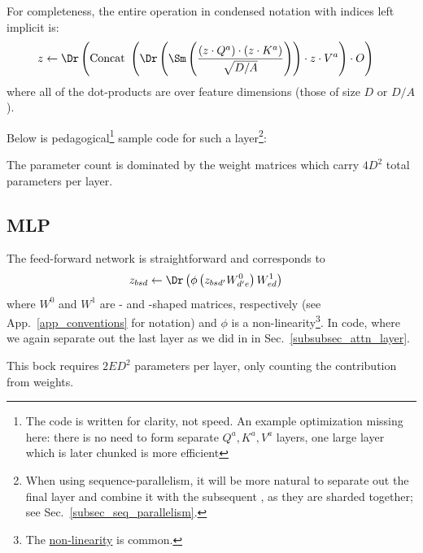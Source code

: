 \documentclass[11pt]{article}
\begin{document}
For completeness, the entire operation in condensed notation with indices left implicit is:
\begin{align}
    z  &\leftarrow \Dr \left ({\rm Concat} \ \left ( \Dr \left (\Sm  \left ( \frac{ \left ( z \cdot Q ^{ a } \right )\cdot \left ( z \cdot K ^{ a } \right )}{ \sqrt{D/A} }
            \right)\right )\cdot z \cdot V ^{ a } \right ) \cdot O \right ) \label{eq_causal_attn}
\end{align}
where all of the dot-products are over feature dimensions (those of size $ D $ or $ D/A $).

Below is pedagogical\footnote{The
code is written for clarity, not speed. An example optimization missing here: there is no need to
form separate $ Q ^{ a },K ^{ a },V ^{ a} $  layers, one large layer which is later
chunked is more efficient} sample code for such a   layer\footnote{When
using sequence-parallelism, it will be more natural to separate out the final  layer
and combine it with the subsequent , as they are sharded together; see
Sec.~\ref{subsec_seq_parallelism}.}:

The parameter count is dominated by the weight matrices which carry $ 4 D ^{ 2 } $ total parameters per layer.


\subsection{MLP \label{subsubsec_mlp} }

The feed-forward network is straightforward and corresponds to
\begin{align}
  z _{ bsd } &\leftarrow \Dr \left (\phi \left ( z _{ bsd' }W ^{ 0 }_{ d'e } \right ) W ^{ 1 } _{ ed
      } \right ) \label{eq_mlp}
\end{align}
where $ W ^{ 0 } $ and $ W ^{ 1 } $ are - and -shaped matrices,
respectively (see App.~\ref{app_conventions} for notation) and $ \phi $ is a
non-linearity\footnote{The 
\href{https://pytorch.org/docs/stable/generated/torch.nn.GELU.html}{non-linearity} is common.}.
In code, where we again separate out the last  layer as we did in in
Sec.~\ref{subsubsec_attn_layer}.  

This bock requires $ 2 E D ^{ 2 } $ parameters per layer, only counting the contribution from
weights.
\end{document}
